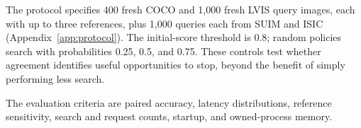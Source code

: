 The protocol specifies 400 fresh COCO and 1,000 fresh LVIS query images, each with up to three references, plus 1,000 queries each from SUIM and ISIC (Appendix~\ref{app:protocol}). The initial-score threshold is 0.8; random policies search with probabilities 0.25, 0.5, and 0.75. These controls test whether agreement identifies useful opportunities to stop, beyond the benefit of simply performing less search.

The evaluation criteria are paired accuracy, latency distributions, reference sensitivity, search and request counts, startup, and owned-process memory.

